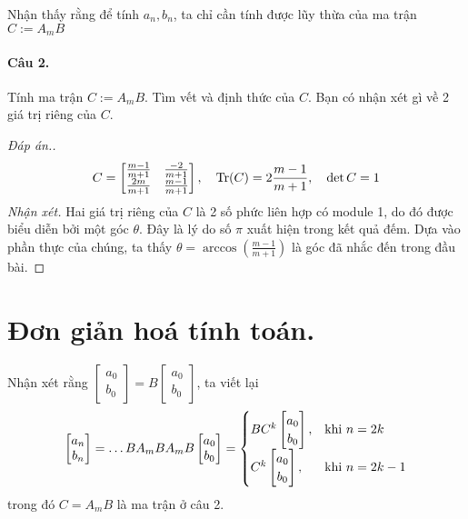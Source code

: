 \documentclass[11pt]{article}
\newcommand{\tr}{\mathop{\rm Tr}\nolimits}
\begin{document}
Nhận thấy rằng để tính \(a_n, b_n\), ta chỉ cần tính được lũy thừa của ma trận \(C :=A_m B\)

\paragraph{Câu 2.}
\label{sec:org7a31879}
Tính ma trận \(C := A_m B\). Tìm vết và định thức của \(C\). Bạn có nhận xét gì về 2
giá trị riêng của \(C\). 


\begin{proof}[Đáp án.]
\[
 C = \begin{bmatrix} \frac{m-1}{m+1} & \frac{-2}{m+1}\\ \frac{2m}{m+1} &
 \frac{m-1}{m+1} \end{bmatrix},\quad \tr(C) = 2\frac{m-1}{m+1},\quad \det C = 1
\]
\emph{Nhận xét.} Hai giá trị riêng của \(C\) là 2 số phức liên hợp có module 1, do đó được biểu diễn bởi
 một góc \(\theta\). Đây là lý do số
 \(\pi\) xuất hiện trong kết quả đếm. Dựa vào phần thực của chúng, ta thấy \(\theta =
 \arccos(\frac{m-1}{m+1})\) là góc đã nhắc đến trong đầu bài.
\end{proof}

\section*{Đơn giản hoá tính toán.}
\label{sec:org59250a0}
Nhận xét rằng \(\begin{bmatrix} a_0\\b_0 \end{bmatrix} = B\begin{bmatrix} a_0\\b_0
\end{bmatrix}\), ta viết lại
\[
 \begin{bmatrix} a_n\\b_n \end{bmatrix} = \dots B A_m B A_m B \begin{bmatrix} a_0\\b_0
\end{bmatrix} = \begin{cases}
B C^k	\begin{bmatrix} a_0\\b_0
\end{bmatrix}	,  & \text{khi $ n = 2k$} \\
C^k \begin{bmatrix} a_0\\b_0
\end{bmatrix}		, & \text{khi $n = 2k - 1$}
		\end{cases}
\]
trong đó \(C = A_m B\) là ma trận ở câu 2.
\end{document}
